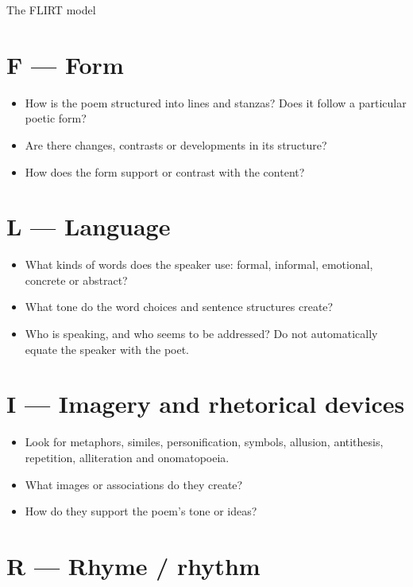\documentclass[11pt,a4paper,oneside]{book}
\begin{document}
\clearpage{}\label{note-flirt-model}
{\displayfont\color{navy}\fontsize{30}{34}\selectfont The FLIRT model\par}\vspace{4mm}

\section*{F — Form}

\begin{itemize}
\item How is the poem structured into lines and stanzas? Does it follow a particular poetic form?
\item Are there changes, contrasts or developments in its structure?
\item How does the form support or contrast with the content?
\end{itemize}

\section*{L — Language}

\begin{itemize}
\item What kinds of words does the speaker use: formal, informal, emotional, concrete or abstract?
\item What tone do the word choices and sentence structures create?
\item Who is speaking, and who seems to be addressed? Do not automatically equate the speaker with the poet.
\end{itemize}

\section*{I — Imagery and rhetorical devices}

\begin{itemize}
\item Look for metaphors, similes, personification, symbols, allusion, antithesis, repetition, alliteration and onomatopoeia.
\item What images or associations do they create?
\item How do they support the poem's tone or ideas?
\end{itemize}

\section*{R — Rhyme / rhythm}
\end{document}
